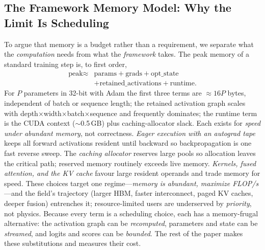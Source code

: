 \documentclass[journal]{IEEEtran}
\begin{document}
\subsection{The Framework Memory Model: Why the Limit Is Scheduling}\label{sec:memmodel}
To argue that memory is a budget rather than a requirement, we separate what
the \emph{computation} needs from what the \emph{framework} takes. The peak
memory of a standard training step is, to first order,
\begin{equation*}
\begin{split}
\text{peak} \approx{}& \text{params} + \text{grads} + \text{opt\_state}\\
&+ \text{retained\_activations} + \text{runtime}.
\end{split}
\end{equation*}
For $P$ parameters in 32-bit with Adam the first three terms are $\approx
16P$ bytes, independent of batch or sequence length; the retained activation
graph scales with depth$\times$width$\times$batch$\times$sequence and
frequently dominates; the runtime term is the CUDA context ($\sim$0.5\,GB)
plus caching-allocator slack. Each exists for \emph{speed under abundant
memory}, not correctness. \emph{Eager execution with an autograd tape} keeps
all forward activations resident until backward so backpropagation is one
fast reverse sweep. The \emph{caching allocator} reserves large pools so
allocation leaves the critical path; reserved memory routinely exceeds live
memory. \emph{Kernels, fused attention, and the KV cache} favour large
resident operands and trade memory for speed. These choices target one
regime---\emph{memory is abundant, maximize FLOP/s}---and the field's
trajectory (larger HBM, faster interconnect, paged KV caches, deeper fusion)
entrenches it; resource-limited users are underserved by \emph{priority}, not
physics. Because every term is a scheduling choice, each has a memory-frugal
alternative: the activation graph can be \emph{recomputed}, parameters and
state can be \emph{streamed}, and logits and scores can be \emph{bounded}.
The rest of the paper makes these substitutions and measures their cost.
\end{document}
